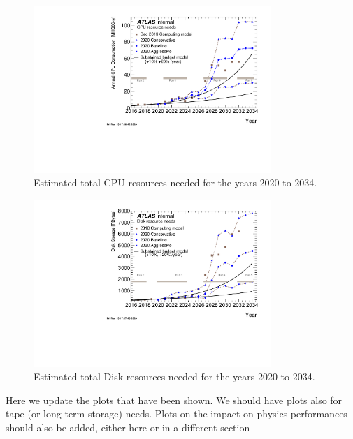 \begin{figure}[h]
    \centering
    \includegraphics[width=0.80\textwidth]{figures/cpuHLLHC_comparison_2020_InputData_11March.pdf}
   \caption{ Estimated total CPU resources  needed  for the years 2020 to  2034.    }  
    \label{fig:cpu}
\end{figure}





\begin{figure}[h]
    \centering
    \includegraphics[width=0.80\textwidth]{figures/diskHLLHC_comparison_plot_2020_InputData_11March.pdf}
   \caption{ Estimated  total Disk resources  needed for the years 2020 to 2034.  }  
    \label{fig:disk}
\end{figure}




Here we update the plots that have been shown. We should have plots also for tape (or long-term storage) needs. 
Plots on the impact on physics performances should also be added, either here or in a different section